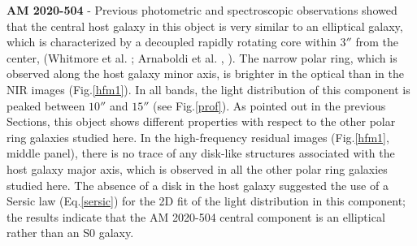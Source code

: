 \documentclass{aa}
\begin{document}
\bigskip

{\bf AM 2020-504} -
Previous photometric and spectroscopic observations 
showed that the central host galaxy in this object is very similar to an 
elliptical galaxy, which is characterized by a decoupled rapidly 
rotating core within $3''$ from the center, (Whitmore et al. 
\cite{whitmore87}; Arnaboldi et al. \cite{magda93}, \cite{magda95}). 
The narrow polar ring, which is observed along the host galaxy minor axis,
is brighter in the optical than in the NIR images (Fig.\ref{hfm1}).  
In all bands, the light distribution of this component is peaked
between $10''$ and $15''$ (see Fig.\ref{prof}). 
As pointed out in the previous Sections,
this object shows different properties with respect to
the other polar ring galaxies studied here. In the high-frequency residual
images (Fig.\ref{hfm1}, middle panel), there is no
trace of any disk-like structures associated with the host galaxy major
axis,  which is observed in all the other polar ring galaxies studied
here. 
The absence of a disk in the host galaxy suggested the use of a
Sersic law (Eq.\ref{sersic}) for the 2D fit of the
light distribution in this component; the results indicate
that the AM 2020-504 central component is an elliptical rather 
than an S0 galaxy.
\bigskip
\end{document}
